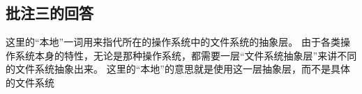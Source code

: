 
\subsection{批注三的回答}
\label{sec:fix:bl3}

这里的“本地”一词用来指代所在的操作系统中的文件系统的抽象层。
由于各类操作系统本身的特性，无论是那种操作系统，都需要一层“文件系统抽象层”来讲不同的文件系统抽象出来。
这里的“本地”的意思就是使用这一层抽象层，而不是具体的文件系统